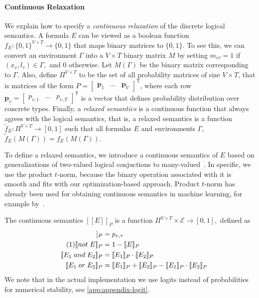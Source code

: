 \documentclass[sigplan,10pt,review,anonymous]{acmart}
\newcommand{\qqpi}[2]{[\![#2]\!]_{#1}}
\newcommand\numberthis{\addtocounter{equation}{1}\tag{\theequation}}
\theoremstyle{plain}
\theoremstyle{remark}
\theoremstyle{definition}
\begin{document}
\paragraph{Continuous Relaxation}
We explain how to specify a \emph{continuous relaxation} of the discrete logical semantics.
A formula $E$ can be viewed as a boolean function $f_E: \{0, 1\}^{V \times T} \rightarrow \{0, 1\}$
that maps binary matrices to $\{0, 1\}.$ To see this, we can convert an environment
$\Gamma$ into a $V \times T$ binary matrix $M$ by setting $m_{v\tau} = 1$ if 
$(x_v, l_\tau) \in \Gamma,$ and 0 otherwise. Let $M(\Gamma)$ be the binary
matrix corresponding to $\Gamma.$ Also, define $\Pi^{V \times T}$ to be the set
of all probability matrices of size $V \times T$,
that is matrices of the form
$P = \begin{bmatrix} \bm{p}_1 & \ldots & \bm{p}_{V} \end{bmatrix}^\mathsf{T}$,
where each row $\bm{p}_v = \begin{bmatrix} p_{v,1} & \ldots & p_{v,{T}} \end{bmatrix}^\mathsf{T}$ 
is a vector that defines probability distribution over concrete types.
Finally, a \emph{relaxed semantics} is a continuous function
that always agrees with the logical semantics, that is, 
a relaxed semantics is a function 
$\tilde{f}_{E} : \Pi^{V \times T}  \rightarrow [0, 1]$
such that all formulas $E$ and environments $\Gamma$,
$\tilde{f}_{E}(M(\Gamma)) = f_E(M(\Gamma)).$

To define a relaxed semantics, we introduce a continuous semantics of $E$ based on generalizations of two-valued logical conjuctions to many-valued~\cite{hajek1998}.
In specific, we use the product $t$-norm, because the binary operation associated with it is smooth and fits with our optimization-based approach.
Product $t$-norm has already been used for obtaining continuous semantics in machine learning, for example by~\citet{rocktaschel15}.

The continuous semantics $\qqpi{P}{E}$ is a function $\Pi^{V \times T} \times \mathcal{E} \rightarrow [0, 1],$ 
defined as
\begin{align*}
  \qqpi{P}{x_v \mathrel{is} l_\tau}  & = p_{v,\tau} \\  \numberthis \label{eq:logical}
  \qqpi{P}{\mathrel{not} E}       & = 1-\qqpi{P}{E}                \\
  \qqpi{P}{E_1 \mathrel{and} E_2} & = \qqpi{P}{E_1} \cdot \qqpi{P}{E_2} \\
  \qqpi{P}{E_1 \mathrel{or} E_2}  & =
  \qqpi{P}{E_1} + \qqpi{P}{E_2} - \qqpi{P}{E_1}\cdot\qqpi{P}{E_2}
\end{align*}
We note that in the actual implementation we use logits instead of probabilities
for numerical stability, see \cref{app:appendix-logit}.
\end{document}
